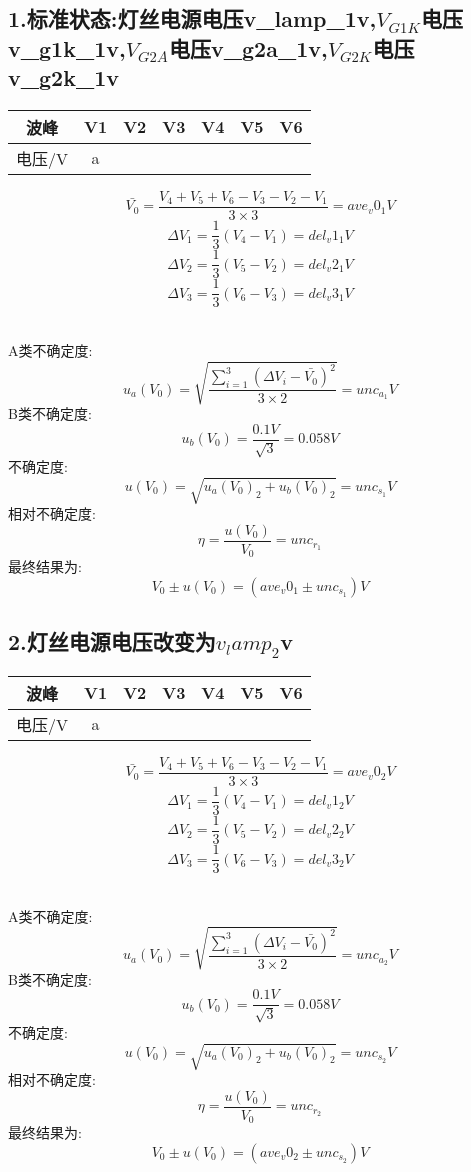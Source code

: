 \subsection*{1.标准状态:灯丝电源电压{{v_lamp_1}}v,$V_{G1K}$电压{{v_g1k_1}}v,$V_{G2A}$电压{{v_g2a_1}}v,$V_{G2K}$电压{{v_g2k_1}}v}
\begin{center}
\begin{tabular}{|c|c|c|c|c|c|c|}
	\hline
	波峰&V1&V2&V3&V4&V5&V6
	\\\hline
	电压/V
	{%
		&{{a}}
	{%
	\\\hline
	\end{tabular}
	\end{center}

$$  \bar{V_0}=\frac{V_4+V_5+V_6-V_3-V_2-V_1}{3\times 3}={{ave_v0_1}}V $$
$$	\Delta V_1=\frac{1}{3}(V_4-V_1)={{del_v1_1}}V $$
$$	\Delta V_2=\frac{1}{3}(V_5-V_2)={{del_v2_1}}V $$
$$	\Delta V_3=\frac{1}{3}(V_6-V_3)={{del_v3_1}}V $$ 

\ \\
A类不确定度:
$$	u_a(V_0)=\sqrt{\frac{\sum\limits_{i=1}^{3} (\Delta V_i-\bar{V_0})^2}{3\times 2}}={{ unc_a_1 }}V $$
B类不确定度:
$$	u_b(V_0)=\frac{0.1V}{\sqrt{3}}=0.058V $$
不确定度:
$$	u(V_0)=\sqrt{u_a(V_0)_2+u_b(V_0)_2}={{unc_s_1}}V $$
相对不确定度:
$$	\eta=\frac{u(V_0)}{V_0}={{unc_r_1}} $$
最终结果为:
$$	V_0 \pm u(V_0) = ({{ave_v0_1}} \pm {{ unc_s_1}})V $$


\subsection*{2.灯丝电源电压改变为${{v_lamp_2}}$v}
\begin{center}
\begin{tabular}{|c|c|c|c|c|c|c|}
	\hline
	波峰&V1&V2&V3&V4&V5&V6
	\\\hline
	电压/V
	{%
		&{{a}}
	{%
	\\\hline
	\end{tabular}
	\end{center}

$$  \bar{V_0}=\frac{V_4+V_5+V_6-V_3-V_2-V_1}{3\times 3}={{ave_v0_2}}V $$
$$	\Delta V_1=\frac{1}{3}(V_4-V_1)={{del_v1_2}}V $$
$$	\Delta V_2=\frac{1}{3}(V_5-V_2)={{del_v2_2}}V $$
$$	\Delta V_3=\frac{1}{3}(V_6-V_3)={{del_v3_2}}V $$ 

\ \\
A类不确定度:
$$	u_a(V_0)=\sqrt{\frac{\sum\limits_{i=1}^{3} (\Delta V_i-\bar{V_0})^2}{3\times 2}}={{ unc_a_2 }}V $$
B类不确定度:
$$	u_b(V_0)=\frac{0.1V}{\sqrt{3}}=0.058V $$
不确定度:
$$	u(V_0)=\sqrt{u_a(V_0)_2+u_b(V_0)_2}={{unc_s_2}}V $$
相对不确定度:
$$	\eta=\frac{u(V_0)}{V_0}={{unc_r_2}} $$
最终结果为:
$$	V_0 \pm u(V_0) = ({{ave_v0_2}} \pm {{ unc_s_2}})V $$


